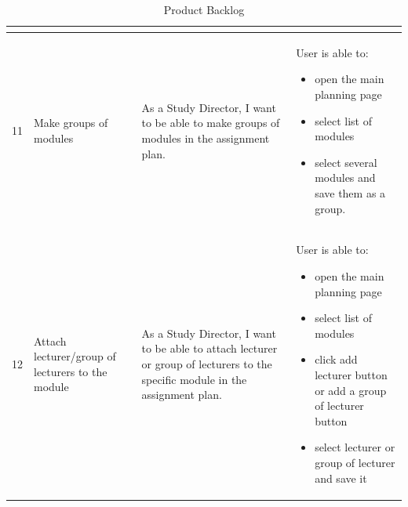 \documentclass{scrartcl}
\begin{document}
\begin{table}[H]
\begin{center}
\begin{tabular}{|p{0.5cm} |p{3cm}|p{5.5cm}|p{5.5cm}|}
\begin{itemize}
\end{itemize}                                                                 \\ \hline

 
 11&
 Make groups of modules&
 As a Study Director, I want to be able to make groups of modules in the assignment plan. &
 
   User is able to:            
\begin{itemize}
\item open the main planning page
\item select list of modules
\item select several modules and save them as a group.
\end{itemize}       \\ \hline

 
 12&
 Attach lecturer/group of lecturers to the module&
 As a Study Director, I want to be able to attach lecturer or group of lecturers to the specific module in the assignment plan. &
 
   User is able to:            
\begin{itemize}
\item open the main planning page
\item select list of modules 
\item click add lecturer button or add a group of lecturer button
\item select lecturer or group of lecturer and save it


\end{itemize}                                                             

  
\end{tabular}
\end{center}
\caption{Product Backlog}
\label{table2}
\end{table}

\pagebreak                                                            
\end{document}
